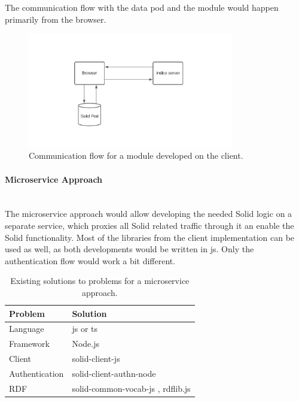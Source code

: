 The communication flow with the data pod and the module would happen primarily from the browser.

\begin{figure}[H]
    \centering
    \includegraphics[width=0.8\textwidth]{prototype/graphs/poc-infrastructure-frontend.jpeg}
    \caption{Communication flow for a module developed on the client.}
    \label{fig:poc-infrastructure-frontend}
\end{figure}

\paragraph{Microservice Approach}\mbox{}\\

The microservice approach would allow developing the needed Solid logic on a separate service, which proxies all Solid related traffic through it an enable the Solid functionality. Most of the libraries from the client implementation can be used as well, as both developments would be written in \gls{js}. Only the authentication flow would work a bit different.

\begin{table}[h!]
    \centering
    \begin{tabular}{| l | l |} 
    \hline
     Problem & Solution \\
     \hline
      Language & \gls{js} or \gls{ts}  \\
      Framework & Node.js  \\
      Client & solid-client-js \cite{solid-client-js}  \\
      Authentication & solid-client-authn-node \cite{solid-client-authn-node} \\
      RDF & solid-common-vocab-js \cite{solid-common-vocab-js}, rdflib.js \cite{rdflib.js}  \\
    \hline
    \end{tabular}
    \vspace{0.75cm}
    \caption{Existing solutions to problems for a microservice approach.}
    \label{table:2}
\end{table}

